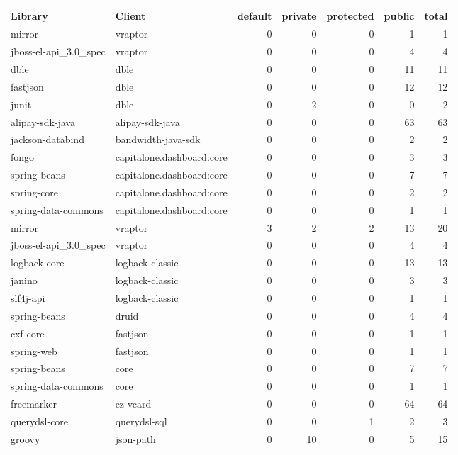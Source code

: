 \begin{table}[ht]
\centering
\begingroup\scriptsize
\begin{tabular}{llrrrrr}
  \hline
Library & Client & default & private & protected & public & total \\ 
  \hline
mirror & vraptor & 0 & 0 & 0 & 1 & 1 \\ 
  jboss-el-api\_3.0\_spec & vraptor & 0 & 0 & 0 & 4 & 4 \\ 
  dble & dble & 0 & 0 & 0 & 11 & 11 \\ 
  fastjson & dble & 0 & 0 & 0 & 12 & 12 \\ 
  junit & dble & 0 & 2 & 0 & 0 & 2 \\ 
  alipay-sdk-java & alipay-sdk-java & 0 & 0 & 0 & 63 & 63 \\ 
  jackson-databind & bandwidth-java-sdk & 0 & 0 & 0 & 2 & 2 \\ 
  fongo & capitalone.dashboard:core & 0 & 0 & 0 & 3 & 3 \\ 
  spring-beans & capitalone.dashboard:core & 0 & 0 & 0 & 7 & 7 \\ 
  spring-core & capitalone.dashboard:core & 0 & 0 & 0 & 2 & 2 \\ 
  spring-data-commons & capitalone.dashboard:core & 0 & 0 & 0 & 1 & 1 \\ 
  mirror & vraptor & 3 & 2 & 2 & 13 & 20 \\ 
  jboss-el-api\_3.0\_spec & vraptor & 0 & 0 & 0 & 4 & 4 \\ 
  logback-core & logback-classic & 0 & 0 & 0 & 13 & 13 \\ 
  janino & logback-classic & 0 & 0 & 0 & 3 & 3 \\ 
  slf4j-api & logback-classic & 0 & 0 & 0 & 1 & 1 \\ 
  spring-beans & druid & 0 & 0 & 0 & 4 & 4 \\ 
  cxf-core & fastjson & 0 & 0 & 0 & 1 & 1 \\ 
  spring-web & fastjson & 0 & 0 & 0 & 1 & 1 \\ 
  spring-beans & core & 0 & 0 & 0 & 7 & 7 \\ 
  spring-data-commons & core & 0 & 0 & 0 & 1 & 1 \\ 
  freemarker & ez-vcard & 0 & 0 & 0 & 64 & 64 \\ 
  querydsl-core & querydsl-sql & 0 & 0 & 1 & 2 & 3 \\ 
  groovy & json-path & 0 & 10 & 0 & 5 & 15 \\ 

\end{tabular}
\end{table}
